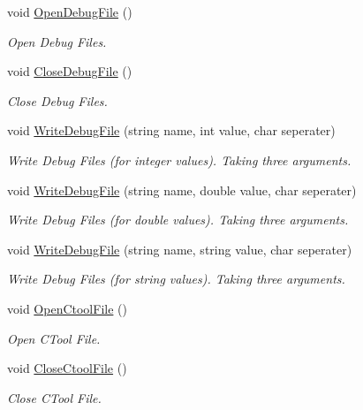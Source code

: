 \begin{DoxyCompactItemize}
void \mbox{\hyperlink{class_global_vars_ae4b87d624a1c79b1cdaca50e96e2275f}{Open\+Debug\+File}} ()
\begin{DoxyCompactList}\small\item\em Open Debug Files. \end{DoxyCompactList}\item 
void \mbox{\hyperlink{class_global_vars_ab2ed77b9ddaa227fa52cd7cfec57e531}{Close\+Debug\+File}} ()
\begin{DoxyCompactList}\small\item\em Close Debug Files. \end{DoxyCompactList}\item 
void \mbox{\hyperlink{class_global_vars_a9b00f176257c6baa1223395f6aeb8856}{Write\+Debug\+File}} (string name, int value, char seperater)
\begin{DoxyCompactList}\small\item\em Write Debug Files (for integer values). Taking three arguments. \end{DoxyCompactList}\item 
void \mbox{\hyperlink{class_global_vars_a18ca1a2e643e9d3a9a265d7ca50212e0}{Write\+Debug\+File}} (string name, double value, char seperater)
\begin{DoxyCompactList}\small\item\em Write Debug Files (for double values). Taking three arguments. \end{DoxyCompactList}\item 
void \mbox{\hyperlink{class_global_vars_a3ef89864d5d06682b53941d80ad7ed36}{Write\+Debug\+File}} (string name, string value, char seperater)
\begin{DoxyCompactList}\small\item\em Write Debug Files (for string values). Taking three arguments. \end{DoxyCompactList}\item 
void \mbox{\hyperlink{class_global_vars_a946e269cb4206093e882f56cbe93e266}{Open\+Ctool\+File}} ()
\begin{DoxyCompactList}\small\item\em Open C\+Tool File. \end{DoxyCompactList}\item 
void \mbox{\hyperlink{class_global_vars_a11a63936e576b275d962584c5d415147}{Close\+Ctool\+File}} ()
\begin{DoxyCompactList}\small\item\em Close C\+Tool File. \end{DoxyCompactList}\item 

\end{DoxyCompactItemize}

